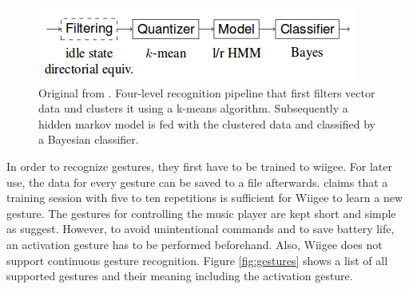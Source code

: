 \begin{figure}[bth]
	\myfloatalign
	\includegraphics[width=.99\linewidth]{img/wiigeePipeline.png}
	\caption{Original from \cite{Schlomer:2008:GRW:1347390.1347395}. Four-level recognition pipeline that first filters vector data und clusters it using a k-means algorithm. Subsequently a hidden markov model is fed with the clustered data and classified by a Bayesian classifier.}
	\label{fig:wiigeePipeline}
\end{figure}

In order to recognize gestures, they first have to be trained to wiigee. For later use, the data for every gesture can be saved to a file afterwards. \cite{Schlomer:2008:GRW:1347390.1347395} claims that a training session with five to ten repetitions is sufficient for Wiigee to learn a new gesture. The gestures for controlling the music player are kept short and simple as \cite{kuhnel2011m} suggest. However, to avoid unintentional commands and to save battery life, an activation gesture has to be performed beforehand. Also, Wiigee does not support continuous gesture recognition. Figure \ref{fig:gestures} shows a list of all supported gestures and their meaning including the activation gesture.

\newpage

